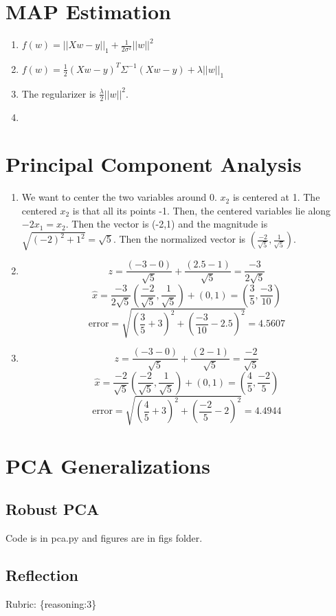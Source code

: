 \documentclass{article}
\def\rubric#1{\gre{Rubric: \{#1\}}}{}
\def\gre#1{{\color{gre}#1}}
\begin{document}
\section{MAP Estimation}
\begin{enumerate}
    \item $f(w) = ||Xw-y||_1 + \frac{1}{2\sigma^2}||w||^2 $
    \item $f(w) = \frac{1}{2}(Xw-y)^T\Sigma^{-1}(Xw-y)+\lambda||w||_1$
    \item The regularizer is $\frac{\lambda}{2}||w||^2$.
    \item 
\end{enumerate}

\section{Principal Component Analysis}
\begin{enumerate}
    \item We want to center the two variables around 0. $x_2$ is centered at 1. The centered $x_2$ is that all
    its points -1. Then, the centered variables lie along $-2x_1 = x_2$. Then the vector is (-2,1) and the magnitude
    is $\sqrt{(-2)^2+1^2} = \sqrt{5}$. Then the normalized vector is $(\frac{-2}{\sqrt{5}}, \frac{1}{\sqrt{5}})$.
    \item $$z = \frac{(-3-0)}{\sqrt{5}}+\frac{(2.5-1)}{\sqrt{5}} = \frac{-3}{2\sqrt{5}}$$
    $$\hat{x} = \frac{-3}{2\sqrt{5}}(\frac{-2}{\sqrt{5}}, \frac{1}{\sqrt{5}})+(0,1) = (\frac{3}{5},\frac{-3}{10})$$
    $$\text{error} = \sqrt{(\frac{3}{5}+3)^2+(\frac{-3}{10}-2.5)^2} = 4.5607$$
    \item $$z = \frac{(-3-0)}{\sqrt{5}}+\frac{(2-1)}{\sqrt{5}} = \frac{-2}{\sqrt{5}}$$
    $$\hat{x} = \frac{-2}{\sqrt{5}}(\frac{-2}{\sqrt{5}}, \frac{1}{\sqrt{5}})+(0,1) = (\frac{4}{5},\frac{-2}{5})$$
    $$\text{error} = \sqrt{(\frac{4}{5}+3)^2+(\frac{-2}{5}-2)^2} = 4.4944$$
\end{enumerate}

\section{PCA Generalizations}

\subsection{Robust PCA}
Code is in pca.py and figures are in figs folder.

\subsection{Reflection}
\rubric{reasoning:3}
\end{document}
